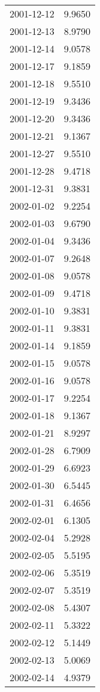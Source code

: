 \begin{tabular}{lr}
2001-12-12 &      9.9650 \\
2001-12-13 &      8.9790 \\
2001-12-14 &      9.0578 \\
2001-12-17 &      9.1859 \\
2001-12-18 &      9.5510 \\
2001-12-19 &      9.3436 \\
2001-12-20 &      9.3436 \\
2001-12-21 &      9.1367 \\
2001-12-27 &      9.5510 \\
2001-12-28 &      9.4718 \\
2001-12-31 &      9.3831 \\
2002-01-02 &      9.2254 \\
2002-01-03 &      9.6790 \\
2002-01-04 &      9.3436 \\
2002-01-07 &      9.2648 \\
2002-01-08 &      9.0578 \\
2002-01-09 &      9.4718 \\
2002-01-10 &      9.3831 \\
2002-01-11 &      9.3831 \\
2002-01-14 &      9.1859 \\
2002-01-15 &      9.0578 \\
2002-01-16 &      9.0578 \\
2002-01-17 &      9.2254 \\
2002-01-18 &      9.1367 \\
2002-01-21 &      8.9297 \\
2002-01-28 &      6.7909 \\
2002-01-29 &      6.6923 \\
2002-01-30 &      6.5445 \\
2002-01-31 &      6.4656 \\
2002-02-01 &      6.1305 \\
2002-02-04 &      5.2928 \\
2002-02-05 &      5.5195 \\
2002-02-06 &      5.3519 \\
2002-02-07 &      5.3519 \\
2002-02-08 &      5.4307 \\
2002-02-11 &      5.3322 \\
2002-02-12 &      5.1449 \\
2002-02-13 &      5.0069 \\
2002-02-14 &      4.9379 \\

\end{tabular}
